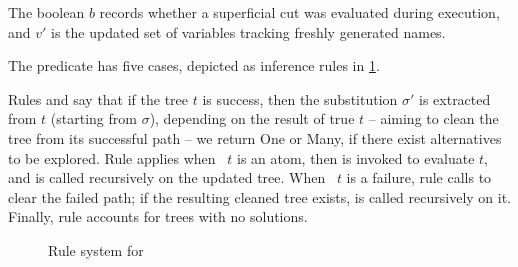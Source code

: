 The boolean $b$ records whether a superficial cut was evaluated during execution,
and $v'$ is the updated set of variables tracking freshly generated names.

The \runT predicate has five cases, depicted as inference rules in \cref{fig:run-rules}.


Rules \stopot and \stopt say that if the tree $t$ is success, then the substitution
$\sigma'$ is extracted from $t$ (starting from $\sigma$), depending
on the result of \na true $t$ -- aiming to clean the tree from its successful
path -- we return One or Many, if there exist alternatives
to be explored. Rule \stept applies when \pathend\ $t$ is an atom,
then \step is invoked to evaluate $t$, and \runT is called recursively on the
updated tree. When \pathend\ $t$ is a failure, rule \backt calls \na
to clear the failed path; if the resulting cleaned tree exists, \runT is
called recursively on it. Finally, rule \failt accounts for trees with no
solutions.


\begin{figure}

  



  \caption{Rule system for \runT}
  \label{fig:run-rules}
\end{figure}

\label{sec:run-prop}


